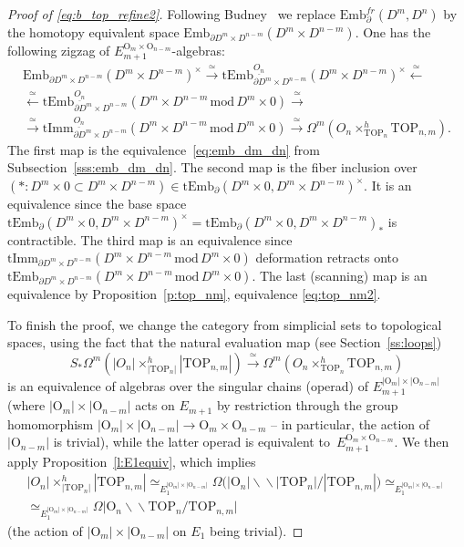 \documentclass[11pt]{amsart}
\theoremstyle{definition}
\newcommand{\Embfrmn}{\mathrm{Emb}_\partial^{fr}(D^m,D^n)}
\newcommand{\Emb}{\mathrm{Emb}}
\newcommand{\tImm}{\mathrm{tImm}}
\newcommand{\tEmb}{\mathrm{tEmb}}
\newcommand{\TOP}{\mathrm{TOP}}
\newcommand{\OO}{\mathrm{O}}
\newcommand{\mmod}{\,\mathrm{mod}\,}
\newcommand{\bbslash}{\backslash\!\!\backslash}
\numberwithin{equation}{section}
\begin{document}
\begin{proof}[Proof of \eqref{eq:b_top_refine2}]
Following Budney~\cite{Budney_cubes} we replace $\Embfrmn$ by the homotopy equivalent space 
$\Emb_{\partial D^m\times D^{n-m}}(D^m\times D^{n-m})$. One has the following zigzag of $E_{m+1}^{\OO_m\times\OO_{n-m}}$-algebras:
\begin{multline}\label{eq:zigzag_refine2}
\Emb_{\partial D^m\times D^{n-m}}(D^m\times D^{n-m})^\times\xrightarrow{\,\simeq\,}
\tEmb_{\partial D^m\times D^{n-m}}^{\underline{O_n}}(D^m\times D^{n-m})^\times   \xleftarrow{\,\simeq\,}\\
 \xleftarrow{\,\simeq\,}
\tEmb_{\partial D^m\times D^{n-m}}^{\underline{O_n}}(D^m\times D^{n-m}\mmod D^m\times 0)\xrightarrow{\,\simeq\,} \\
\xrightarrow{\,\simeq\,} \tImm_{\partial D^m\times D^{n-m}}^{\underline{O_n}}(D^m\times D^{n-m}\mmod D^m\times 0)
\xrightarrow{\,\simeq\,} \Omega^m\left(O_n\times^h_{\TOP_n}\TOP_{n,m}\right).
\end{multline}
The first map is the equivalence~\eqref{eq:emb_dm_dn} from Subsection~\ref{sss:emb_dm_dn}. The second map is the fiber 
inclusion over $(*\colon D^m\times 0\subset D^m\times D^{n-m})\in
\tEmb_\partial(D^m\times 0,D^m\times D^{n-m})^\times$.
It is an equivalence since the base space $\tEmb_\partial(D^m\times 0,D^m\times D^{n-m})^\times=\tEmb_\partial(D^m\times 0,D^m\times D^{n-m})_*$ is contractible. The third map is an equivalence since $\tImm_{\partial D^m\times D^{n-m}}(D^m\times D^{n-m}\mmod D^m\times 0)$ deformation retracts onto  $\tEmb_{\partial D^m\times D^{n-m}}(D^m\times D^{n-m}\mmod D^m\times 0)$. %
 The last (scanning) map is an equivalence by Proposition~\ref{p:top_nm}, equivalence \eqref{eq:top_nm2}.

To finish the proof, we change the category from simplicial sets to topological spaces, using the fact that the natural evaluation map (see Section~\ref{ss:loops}) 
\[
S_*\Omega^m\left(|O_n|\times^h_{|\TOP_n|}|\TOP_{n,m}|\right)
\xrightarrow{\,\simeq\,}\Omega^m\left(O_n\times^h_{\TOP_n}\TOP_{n,m}\right)
\]
is an equivalence of algebras over the singular chains (operad) of $E_{m+1}^{|\OO_m|\times|\OO_{n-m}|}$ (where
$|\OO_m|\times|\OO_{n-m}|$ acts on $E_{m+1}$ by restriction through the group homomorphism 
$|\OO_m|\times|\OO_{n-m}|\to \OO_m\times\OO_{n-m}$ -- in particular, the action of $|\OO_{n-m}|$ is trivial), %
while the latter operad is equivalent to~$E_{m+1}^{\OO_m\times\OO_{n-m}}$. We then apply Proposition~\ref{l:E1equiv}, which implies
\begin{multline*}
|O_n|\times^h_{|\TOP_n|}|\TOP_{n,m}|\simeq_{E_1^{|\OO_m|\times|\OO_{n-m}|}}\Omega\bigl(|\OO_n|\bbslash|\TOP_n|/|\TOP_{n,m}|\bigr)
\simeq_{E_1^{|\OO_m|\times|\OO_{n-m}|}}\\
\simeq_{E_1^{|\OO_m|\times|\OO_{n-m}|}}
\Omega\bigl|\OO_n\bbslash\TOP_n/\TOP_{n,m}\bigr|
\end{multline*}
(the action of $|\OO_m|\times|\OO_{n-m}|$ on $E_1$ being trivial).
\end{proof}
\end{document}
